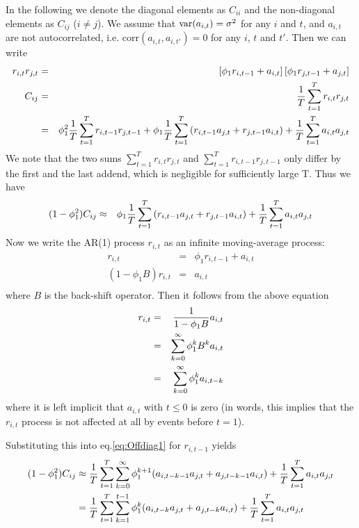 In the following we denote the diagonal elements as $C_{ii}$ and the
non-diagonal elements as $C_{ij}$ ($i \neq j$). We assume that
$\text{var}(a_{i,t}) = \sigma^2$ for any $i$ and $t$, and $a_{i,t}$ are not
autocorrelated, i.e. $\text{corr}(a_{i,t}, a_{i, t'}) = 0$ for any
$i$, $t$ and $t'$. Then we can write
\begin{eqnarray*}
  r_{i,t} r_{j, t} &=& \left[
    \phi_1 r_{i, t-1} + a_{i, t}
  \right] \left[
    \phi_1 r_{j, t-1} + a_{j, t}
  \right] \\
  C_{ij} &=& {1 \over T}\sum_{t=1}^T r_{i,t} r_{j, t} \\
  &=& \phi_1^2 {1 \over T}\sum_{t=1}^Tr_{i,t-1} r_{j, t-1} +
  \phi_1{1 \over T}\sum_{t=1}^T\left(
    r_{i, t-1} a_{j, t} + r_{j, t-1} a_{i, t}
  \right) + {1 \over T}\sum_{t=1}^T a_{i,t} a_{j,t}
\end{eqnarray*}
We note that the two sums $\sum_{t=1}^T r_{i,t} r_{j, t}$ and
$\sum_{t=1}^T r_{i,t-1} r_{j, t-1}$ only differ by the first and the
last addend, which is negligible for sufficiently large T. Thus we
have
\begin{equation}\label{eq:Offdiag1}
  \begin{aligned}
    (1 - \phi_1^2)C_{ij} &\approx& \phi_1 {1 \over T} \sum_{t=1}^T
    \left(r_{i, t-1} a_{j, t} + r_{j, t-1} a_{i, t} \right)
    + {1 \over T}\sum_{t=1}^T a_{i,t} a_{j,t}
  \end{aligned}
\end{equation}
Now we write the AR(1) process $r_{i,t}$ as an infinite moving-average
process:
\begin{eqnarray*}
  r_{i, t} &=& \phi_1 r_{i, t-1} + a_{i,t} \\
  (1 - \phi_1 B) r_{i, t} &=& a_{i,t} \\
\end{eqnarray*}
where $B$ is the back-shift operator. Then it follows from the above
equation
\begin{eqnarray*}
  r_{i,t} &=& {1 \over 1 - \phi_1 B} a_{i,t} \\
  &=& \sum_{k=0}^\infty \phi_1^k B^k a_{i,t} \\
  &=& \sum_{k=0}^\infty \phi_1^k a_{i,t-k} \\
\end{eqnarray*}
where it is left implicit that $a_{i, t}$ with $t \leq 0$ is zero (in
words, this implies that the $r_{i,t}$ process is not affected at all
by events before $t = 1$).

Substituting this into eq.\ref{eq:Offdiag1} for $r_{i,t-1}$ yields
\begin{equation}
  \label{eq:Offdiag2}
  \begin{aligned}
  (1 - \phi_1^2)C_{ij} &\approx
  {1 \over T} \sum_{t=1}^T \sum_{k=0}^\infty\phi_1^{k+1} (a_{i, t-k-1}
  a_{j, t} + a_{j, t-k-1} a_{i, t})
  + {1 \over T} \sum_{t=1}^T a_{i,t} a_{j,t} \\
  &=
  {1 \over T} \sum_{t=1}^{T} \sum_{k=1}^{t-1}\phi_1^k (a_{i, t-k}
  a_{j, t} + a_{j, t-k} a_{i, t})
  + {1 \over T} \sum_{t=1}^{T} a_{i,t} a_{j,t}\\
  \end{aligned}
\end{equation}


